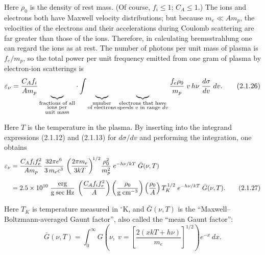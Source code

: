 Here $\rho_0$ is the density of rest mass.  (Of course, $f_i \leq 1$; $C_A \leq 1$.)  The ions
and electrons both have Maxwell velocity distributions; but because $m_e \ll A m_p$,
the velocities of the electrons and their accelerations during Coulomb scattering
are far greater than those of the ions.  Therefore, in calculating bremsstrahlung
one can regard the ions as at rest.  The number of photons per unit mass of plasma
is $f_e/m_p$, so the total power per unit frequency emitted from one gram of plasma
by electron-ion scatterings is
\begin{equation}
\varepsilon_\nu
= \frac{C_A f_i}{A m_p}
\underbrace{\vphantom{\bigg|}\quad}_{\substack{
\text{fractions of all} \\
\text{ions per} \\
\text{unit mass}
}}
\cdot \int
\underbrace{\vphantom{\bigg|}\quad}_{\substack{
\text{number} \\
\text{of electrons}
}}
\underbrace{\vphantom{\bigg|}\quad}_{\substack{
\text{electrons that have} \\
\text{speeds $v$ in range $dv$}
}}
\frac{f_e \rho_0}{m_p}\;v\,h\nu\;
\frac{d\sigma}{dv}\;dv.
\tag{2.1.26}
\end{equation}

Here $T$ is the temperature in the plasma.  By inserting into the integrand
expressions (2.1.12) and (2.1.13) for $d\sigma/dv$ and performing the integration, one
obtains
\begin{align}
\varepsilon_\nu
&= \frac{C_A f_i f_e^2}{A m_p}\,
\frac{32\pi e^6}{3\,m_e c^3}\,
\left(\frac{2\pi m_e}{3kT}\right)^{\!1/2}\!
\frac{\rho_0^2}{m_p^2}\;
e^{-h\nu/kT}\;
\bar{G}(\nu,T)
\notag\\[4pt]
&= 2.5 \times 10^{10}\;
\frac{\text{erg}}{\text{g\;sec\;Hz}}\;
\left(\frac{C_A f_i f_e^2}{A}\right)
\left(\frac{\rho_0}{\text{g\;cm}^{-3}}\right)
\left(\frac{\rho_0}{A}\right)
T_K^{\,1/2}\;e^{-h\nu/kT}\;\bar{G}(\nu,T).
\tag{2.1.27}
\end{align}


Here $T_K$ is temperature measured in ${}^\circ$K, and $\bar{G}(\nu,T)$ is the ``Maxwell--Boltzmann-averaged
Gaunt factor'', also called the ``mean Gaunt factor'':
\begin{equation}
\bar{G}(\nu,T) = \int_0^\infty
G\!\left(\nu,\;v = \left[\frac{2(xkT + h\nu)}{m_e}\right]^{1/2}\right)
e^{-x}\,dx.
\tag{2.1.28}
\end{equation}

